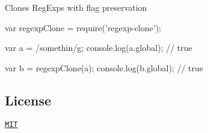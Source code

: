 Clones Reg\+Exps with flag preservation


\begin{DoxyCode}
var regexpClone = require('regexp-clone');

var a = /somethin/g;
console.log(a.global); // true

var b = regexpClone(a);
console.log(b.global); // true
\end{DoxyCode}


\subsection*{License}

\href{https://github.com/aheckmann/regexp-clone/blob/master/LICENSE}{\tt M\+IT} 